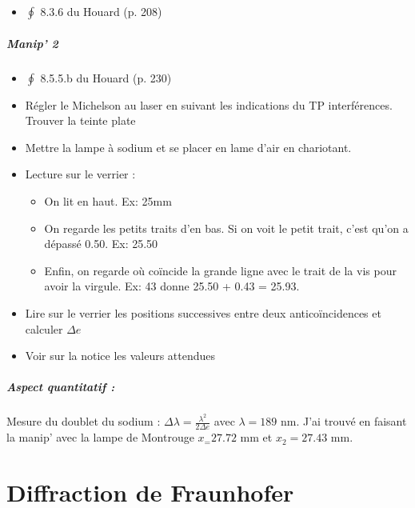 \documentclass[11pt]{report}
\numberwithin{figure}{section}
\numberwithin{equation}{section}
\numberwithin{table}{section}
\newcommand{\1}{\boldsymbol{1}}
\begin{document}
\begin{tcolorbox}[breakable, enhanced, colback=red!2!white,colframe=mycolor!85!black,title=\textbf{\textbf{Expérience}}]
\begin{itemize}[label=$\triangleright$]
		\item $\oint$ 8.3.6 du Houard (p. 208)
\end{itemize}

\paragraph*{Manip' 2}

\begin{itemize}[label=$\triangleright$]
		\item $\oint$ 8.5.5.b du Houard (p. 230)
		\item Régler le Michelson au laser en suivant les indications du TP interférences. Trouver la teinte plate
		\item Mettre la lampe à sodium et se placer en lame d'air en chariotant.
		\item Lecture sur le verrier : 
		\begin{itemize}
		\item On lit en haut. Ex: 25mm
		\item On regarde les petits traits d'en bas. Si on voit le petit trait, c'est qu'on a dépassé 0.50. Ex: 25.50
		\item Enfin, on regarde où coïncide la grande ligne avec le trait de la vis pour avoir la virgule. Ex: 43 donne 25.50 + 0.43 = 25.93.
		\end{itemize}
		\item Lire sur le verrier les positions successives entre deux anticoïncidences et calculer $\Delta e$
		\item Voir sur la notice les valeurs attendues
\end{itemize}

\paragraph*{Aspect quantitatif :} Mesure du doublet du sodium : $\Delta \lambda = \frac{\lambda^2}{2 \Delta e}$ avec $\lambda = 189$ nm. J'ai trouvé en faisant la manip' avec la lampe de Montrouge $x_ = 27.72$ mm et $x_2 = 27.43$ mm.


\end{tcolorbox}



\newpage



\chapter{Diffraction de Fraunhofer}
\end{document}
